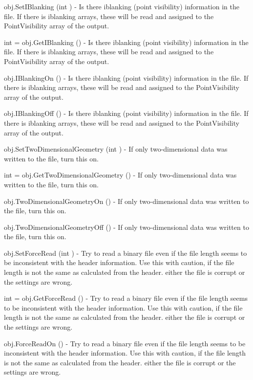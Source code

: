 \begin{DoxyItemize}
\item {\ttfamily obj.\-Set\-I\-Blanking (int )} -\/ Is there iblanking (point visibility) information in the file. If there is iblanking arrays, these will be read and assigned to the Point\-Visibility array of the output.  
\item {\ttfamily int = obj.\-Get\-I\-Blanking ()} -\/ Is there iblanking (point visibility) information in the file. If there is iblanking arrays, these will be read and assigned to the Point\-Visibility array of the output.  
\item {\ttfamily obj.\-I\-Blanking\-On ()} -\/ Is there iblanking (point visibility) information in the file. If there is iblanking arrays, these will be read and assigned to the Point\-Visibility array of the output.  
\item {\ttfamily obj.\-I\-Blanking\-Off ()} -\/ Is there iblanking (point visibility) information in the file. If there is iblanking arrays, these will be read and assigned to the Point\-Visibility array of the output.  
\item {\ttfamily obj.\-Set\-Two\-Dimensional\-Geometry (int )} -\/ If only two-\/dimensional data was written to the file, turn this on.  
\item {\ttfamily int = obj.\-Get\-Two\-Dimensional\-Geometry ()} -\/ If only two-\/dimensional data was written to the file, turn this on.  
\item {\ttfamily obj.\-Two\-Dimensional\-Geometry\-On ()} -\/ If only two-\/dimensional data was written to the file, turn this on.  
\item {\ttfamily obj.\-Two\-Dimensional\-Geometry\-Off ()} -\/ If only two-\/dimensional data was written to the file, turn this on.  
\item {\ttfamily obj.\-Set\-Force\-Read (int )} -\/ Try to read a binary file even if the file length seems to be inconsistent with the header information. Use this with caution, if the file length is not the same as calculated from the header. either the file is corrupt or the settings are wrong.  
\item {\ttfamily int = obj.\-Get\-Force\-Read ()} -\/ Try to read a binary file even if the file length seems to be inconsistent with the header information. Use this with caution, if the file length is not the same as calculated from the header. either the file is corrupt or the settings are wrong.  
\item {\ttfamily obj.\-Force\-Read\-On ()} -\/ Try to read a binary file even if the file length seems to be inconsistent with the header information. Use this with caution, if the file length is not the same as calculated from the header. either the file is corrupt or the settings are wrong.  

\end{DoxyItemize}

